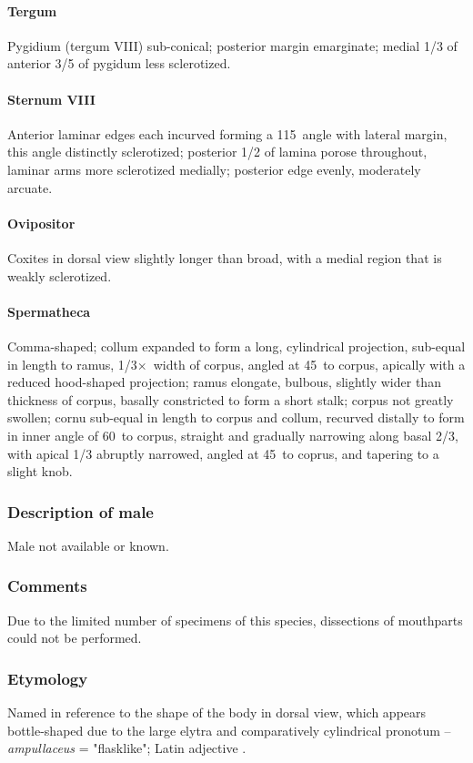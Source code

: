 \documentclass[fleqn,10pt,lineno]{wlpeerj} %
\newcommand{\td}{\textdegree~}
\newcommand{\x}{$\times$~}
\begin{document}
			\paragraph{Tergum}
				Pygidium (tergum VIII) sub-conical; posterior margin emarginate; medial 1/3 of anterior 3/5 of pygidum less sclerotized.		
			\paragraph{Sternum VIII}
				Anterior laminar edges each incurved forming a 115\td angle with lateral margin, this angle distinctly sclerotized; posterior 1/2 of lamina porose throughout, laminar arms more sclerotized medially; posterior edge evenly, moderately arcuate.
			\paragraph{Ovipositor}
				Coxites in dorsal view slightly longer than broad, with a medial region that is weakly sclerotized.
			\paragraph{Spermatheca}
				Comma-shaped; collum expanded to form a long, cylindrical projection, sub-equal in length to ramus, 1/3\x width of corpus, angled at 45\td to corpus, apically with a reduced hood-shaped projection; ramus elongate, bulbous, slightly wider than thickness of corpus, basally constricted to form a short stalk; corpus not greatly swollen; cornu sub-equal in length to corpus and collum, recurved distally to form in inner angle of 60\td to corpus, straight and gradually narrowing along basal 2/3, with apical 1/3 abruptly narrowed, angled at 45\td to coprus, and tapering to a slight knob.
		\subsubsection*{Description of male}
			Male not available or known.
		\subsubsection*{Comments}
			Due to the limited number of specimens of this species, dissections of mouthparts could not be performed.
		\subsubsection*{Etymology}
			Named in reference to the shape of the body in dorsal view, which appears bottle-shaped due to the large elytra and comparatively cylindrical pronotum -- \textit{ampullaceus} = "flasklike"; Latin adjective \citep{brown1956}.
\end{document}
